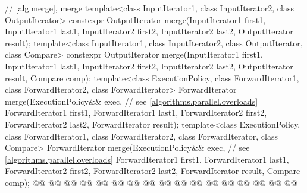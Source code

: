 \begin{codeblock}
{  // \ref{alg.merge}, merge
  template<class InputIterator1, class InputIterator2, class OutputIterator>
    constexpr OutputIterator
      merge(InputIterator1 first1, InputIterator1 last1,
            InputIterator2 first2, InputIterator2 last2,
            OutputIterator result);
  template<class InputIterator1, class InputIterator2, class OutputIterator,
           class Compare>
    constexpr OutputIterator
      merge(InputIterator1 first1, InputIterator1 last1,
            InputIterator2 first2, InputIterator2 last2,
            OutputIterator result, Compare comp);
  template<class ExecutionPolicy, class ForwardIterator1, class ForwardIterator2,
           class ForwardIterator>
    ForwardIterator
      merge(ExecutionPolicy&& exec, // see \ref{algorithms.parallel.overloads}
            ForwardIterator1 first1, ForwardIterator1 last1,
            ForwardIterator2 first2, ForwardIterator2 last2,
            ForwardIterator result);
  template<class ExecutionPolicy, class ForwardIterator1, class ForwardIterator2,
           class ForwardIterator, class Compare>
    ForwardIterator
      merge(ExecutionPolicy&& exec, // see \ref{algorithms.parallel.overloads}
            ForwardIterator1 first1, ForwardIterator1 last1,
            ForwardIterator2 first2, ForwardIterator2 last2,
            ForwardIterator result, Compare comp);
  @@
    @@
        @@
        @@
      @@
      @@
        @@
              @@
    @@
        @@
      @@
      @@
                   @@
                   @@
        @@
              @@
  @\added{\}}@

}
\end{codeblock}
